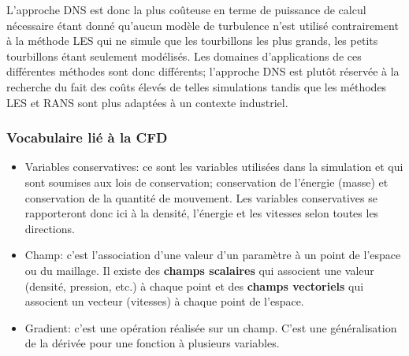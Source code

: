 L'approche DNS est donc la plus coûteuse en terme de puissance de calcul nécessaire étant donné qu'aucun modèle de turbulence n'est utilisé contrairement à la méthode LES qui ne simule que les tourbillons les plus grands, les petits tourbillons étant seulement modélisés. Les domaines d'applications de ces différentes méthodes sont donc différents; l'approche DNS est plutôt réservée à la recherche du fait des coûts élevés de telles simulations tandis que les méthodes LES et RANS sont plus adaptées à un contexte industriel.


\subsubsection{Vocabulaire lié à la CFD}

\begin{itemize}
\item Variables conservatives: ce sont les variables utilisées dans la simulation et qui sont soumises aux lois de conservation; conservation de l'énergie (masse) et conservation de la quantité de mouvement. Les variables conservatives se rapporteront donc ici à la densité, l'énergie et les vitesses selon toutes les directions.
\item Champ: c'est l'association d'une valeur d'un paramètre à un point de l'espace ou du maillage. Il existe des \textbf{champs scalaires} qui associent une valeur (densité, pression, etc.) à chaque point et des \textbf{champs vectoriels} qui associent un vecteur (vitesses) à chaque point de l'espace.
\item Gradient: c'est une opération réalisée sur un champ. C'est une généralisation de la dérivée pour une fonction à plusieurs variables.

\end{itemize}
